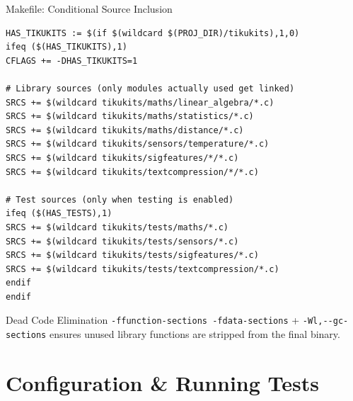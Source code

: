 \documentclass[aspectratio=169, 10pt]{beamer}
\begin{document}
\begin{frame}[fragile]{Makefile: Conditional Source Inclusion}
\begin{lstlisting}[style=bashstyle, title={Makefile --- tikukits sources (library + tests)}]
HAS_TIKUKITS := $(if $(wildcard $(PROJ_DIR)/tikukits),1,0)
ifeq ($(HAS_TIKUKITS),1)
CFLAGS += -DHAS_TIKUKITS=1

# Library sources (only modules actually used get linked)
SRCS += $(wildcard tikukits/maths/linear_algebra/*.c)
SRCS += $(wildcard tikukits/maths/statistics/*.c)
SRCS += $(wildcard tikukits/maths/distance/*.c)
SRCS += $(wildcard tikukits/sensors/temperature/*.c)
SRCS += $(wildcard tikukits/sigfeatures/*/*.c)
SRCS += $(wildcard tikukits/textcompression/*/*.c)

# Test sources (only when testing is enabled)
ifeq ($(HAS_TESTS),1)
SRCS += $(wildcard tikukits/tests/maths/*.c)
SRCS += $(wildcard tikukits/tests/sensors/*.c)
SRCS += $(wildcard tikukits/tests/sigfeatures/*.c)
SRCS += $(wildcard tikukits/tests/textcompression/*.c)
endif
endif
\end{lstlisting}

\vspace{0.3em}
\begin{block}{Dead Code Elimination}
\texttt{-ffunction-sections -fdata-sections} + \texttt{-Wl,-{}-gc-sections}
ensures unused library functions are stripped from the final binary.
\end{block}
\end{frame}

\section{Configuration \& Running Tests}
\end{document}
